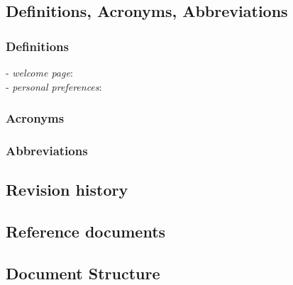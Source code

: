 \subsection{Definitions, Acronyms, Abbreviations}
	\subsubsection{Definitions}
		\begin{description}
			\item[- \textit{welcome page}:] %
			\item[- \textit{personal preferences}:] %
		\end{description}
		
	\subsubsection{Acronyms}
	\subsubsection{Abbreviations}
\subsection{Revision history}
\subsection{Reference documents}
\subsection{Document Structure}